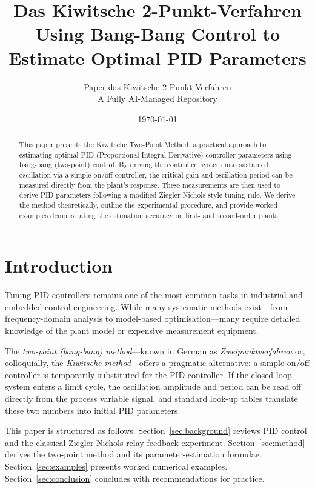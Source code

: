 \documentclass[12pt,a4paper]{article}
\title{\textbf{Das Kiwitsche 2-Punkt-Verfahren}\\
\large Using Bang-Bang Control to Estimate Optimal PID Parameters}
\author{Paper-das-Kiwitsche-2-Punkt-Verfahren\\
\small A Fully AI-Managed Repository}
\date{\today}
\begin{document}
\maketitle

\begin{abstract}
This paper presents the Kiwitsche Two-Point Method, a practical approach to estimating
optimal PID (Proportional-Integral-Derivative) controller parameters using bang-bang
(two-point) control. By driving the controlled system into sustained oscillation via a
simple on/off controller, the critical gain and oscillation period can be measured
directly from the plant's response. These measurements are then used to derive PID
parameters following a modified Ziegler-Nichols-style tuning rule. We derive the method
theoretically, outline the experimental procedure, and provide worked examples
demonstrating the estimation accuracy on first- and second-order plants.
\end{abstract}

\tableofcontents
\newpage

\section{Introduction}

Tuning PID controllers remains one of the most common tasks in industrial and embedded
control engineering. While many systematic methods exist---from frequency-domain
analysis to model-based optimisation---many require detailed knowledge of the plant
model or expensive measurement equipment.

The \emph{two-point (bang-bang) method}---known in German as
\emph{Zweipunktverfahren} or, colloquially, the \emph{Kiwitsche method}---offers a
pragmatic alternative: a simple on/off controller is temporarily substituted for the
PID controller. If the closed-loop system enters a limit cycle, the oscillation
amplitude and period can be read off directly from the process variable signal, and
standard look-up tables translate these two numbers into initial PID parameters.

This paper is structured as follows.
Section~\ref{sec:background} reviews PID control and the classical Ziegler-Nichols
relay-feedback experiment.
Section~\ref{sec:method} derives the two-point method and its parameter-estimation
formulae.
Section~\ref{sec:examples} presents worked numerical examples.
Section~\ref{sec:conclusion} concludes with recommendations for practice.
\end{document}
